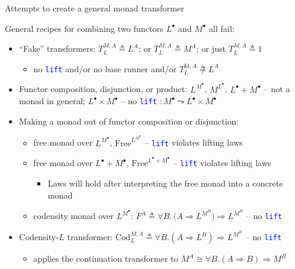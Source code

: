 \documentclass[english]{beamer}
\begin{document}
\begin{frame}{Attempts to create a general monad transformer}

{\footnotesize{}\vspace{-0.1cm}}General recipes for combining two
functors $L^{\bullet}$ and $M^{\bullet}$ all fail:
\begin{itemize}
\item ``Fake'' transformers: $T_{L}^{M,A}\triangleq L^{A}$; or $T_{L}^{M,A}\triangleq M^{A}$;
or just $T_{L}^{M,A}\triangleq1$
\begin{itemize}
\item no \texttt{\textcolor{blue}{\footnotesize{}lift}} and/or no base runner
and/or $T_{L}^{\text{Id},A}\not\triangleq L^{A}$
\end{itemize}
\item Functor composition, disjunction, or product: $L^{M^{\bullet}}$,
$M^{L^{\bullet}}$, $L^{\bullet}+M^{\bullet}$ -- not a monad in
general; $L^{\bullet}\times M^{\bullet}$ -- no \texttt{\textcolor{blue}{\footnotesize{}lift}}
$:M^{\bullet}\leadsto L^{\bullet}\times M^{\bullet}$
\item Making a monad out of functor composition or disjunction:
\begin{itemize}
\item free monad over $L^{M^{\bullet}}$, $\text{Free}^{L^{M^{\bullet}}}$
-- \texttt{\textcolor{blue}{\footnotesize{}lift}} violates lifting
laws
\item free monad over $L^{\bullet}+M^{\bullet}$, $\text{Free}^{L^{\bullet}+M^{\bullet}}$
-- \texttt{\textcolor{blue}{\footnotesize{}lift}} violates lifting
laws
\begin{itemize}
\item Laws will hold after interpreting the free monad into a concrete monad
\end{itemize}
\item codensity monad over $L^{M^{\bullet}}$: $F^{A}\triangleq\forall B.\,\big(A\Rightarrow L^{M^{B}}\big)\Rightarrow L^{M^{B}}$
-- no \texttt{\textcolor{blue}{\footnotesize{}lift}} 
\end{itemize}
\item Codensity-$L$ transformer: $\text{Cod}_{L}^{M,A}\triangleq\forall B.\left(A\Rightarrow L^{B}\right)\Rightarrow L^{M^{B}}$
-- no \texttt{\textcolor{blue}{\footnotesize{}lift}} 
\begin{itemize}
\item applies the continuation transformer to $M^{A}\cong\forall B.\left(A\Rightarrow B\right)\Rightarrow M^{B}$

\end{itemize}
\end{itemize}
\end{frame}
\end{document}
